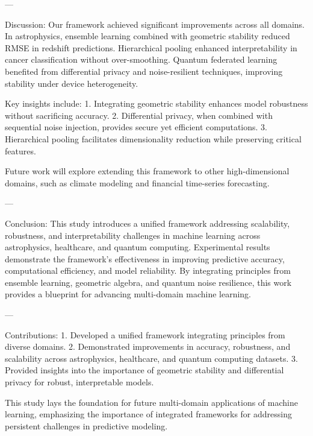 ---

Discussion:  
Our framework achieved significant improvements across all domains. In astrophysics, ensemble learning combined with geometric stability reduced RMSE in redshift predictions. Hierarchical pooling enhanced interpretability in cancer classification without over-smoothing. Quantum federated learning benefited from differential privacy and noise-resilient techniques, improving stability under device heterogeneity.

Key insights include:
1. Integrating geometric stability enhances model robustness without sacrificing accuracy.
2. Differential privacy, when combined with sequential noise injection, provides secure yet efficient computations.
3. Hierarchical pooling facilitates dimensionality reduction while preserving critical features.

Future work will explore extending this framework to other high-dimensional domains, such as climate modeling and financial time-series forecasting.

---

Conclusion:  
This study introduces a unified framework addressing scalability, robustness, and interpretability challenges in machine learning across astrophysics, healthcare, and quantum computing. Experimental results demonstrate the framework's effectiveness in improving predictive accuracy, computational efficiency, and model reliability. By integrating principles from ensemble learning, geometric algebra, and quantum noise resilience, this work provides a blueprint for advancing multi-domain machine learning.

---

Contributions:  
1. Developed a unified framework integrating principles from diverse domains.
2. Demonstrated improvements in accuracy, robustness, and scalability across astrophysics, healthcare, and quantum computing datasets.
3. Provided insights into the importance of geometric stability and differential privacy for robust, interpretable models.

This study lays the foundation for future multi-domain applications of machine learning, emphasizing the importance of integrated frameworks for addressing persistent challenges in predictive modeling.